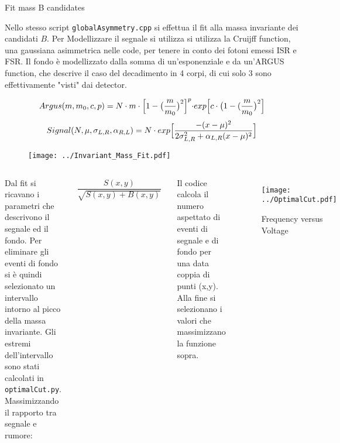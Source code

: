 \documentclass[8pt,a4paper]{beamer}
\begin{document}
\begin{frame}{Fit mass B candidates}

Nello stesso script \texttt{globalAsymmetry.cpp} si effettua il fit alla massa invariante dei candidati $B$. Per Modellizzare il segnale si utilizza si utilizza la Cruijff function, una gaussiana asimmetrica nelle code, per tenere in conto dei fotoni emessi ISR e FSR. Il fondo è modellizzato dalla somma di un'esponenziale e da un'ARGUS function, che descrive il caso del decadimento in 4 corpi, di cui solo 3 sono effettivamente "visti" dai detector.

\begin{equation}
Argus(m,m_{0},c,p) = N \cdot m \cdot \Bigl[1 - \big(\frac{m}{m_{0}} \big)^{2} \Bigl]^{p} \cdot exp \Bigl[c \cdot \big(1 - (\frac{m}{m_{0}}\big)^{2}  \Bigl]
\end{equation}
\begin{equation}
Signal(N,\mu, \sigma_{L,R}, \alpha_{R,L}) = N \cdot exp \Bigl[  \dfrac{ - (x - \mu)^2}{2 \sigma_{L,R}^{2} + \alpha_{L,R} (x - \mu)^2  }	\Bigl]
\end{equation}

\end{frame}

\begin{frame}

\begin{figure}[hbtp]
\centering
\texttt{[image: ../Invariant\_Mass\_Fit.pdf]}
\end{figure}
\end{frame}

\begin{frame}
\begin{columns}
\centering
Dal fit si ricavano i parametri che descrivono il segnale ed il fondo. Per eliminare gli eventi di fondo si è quindi selezionato un intervallo intorno al picco della massa invariante. Gli estremi dell'intervallo sono stati calcolati in \texttt{optimalCut.py}.
Massimizzando il rapporto tra segnale e rumore:

\begin{align*}
\dfrac{S(x,y)}{\sqrt{S(x,y)+B(x,y)}}
\end{align*}

Il codice calcola il numero aspettato di eventi di segnale e di fondo per una data coppia di punti (x,y). Alla fine si selezionano i valori che massimizzano la funzione sopra. 
\begin{figure}
\texttt{[image: ../OptimalCut.pdf]}
\caption{Frequency versus Voltage}
\end{figure}
\end{columns}









\end{frame}
\end{document}
